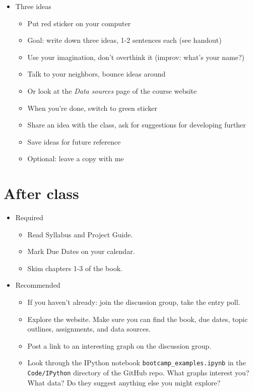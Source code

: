 \begin{itemize}
\item Three ideas
\begin{itemize}
\item Put red sticker on your computer
\item Goal:  write down three ideas, 1-2 sentences each (see handout)
\item Use your imagination, don't overthink it (improv: what's your name?)
\item Talk to your neighbors, bounce ideas around
\item Or look at the {\it Data sources\/} page of the course website
\item When you're done, switch to green sticker
\item Share an idea with the class, ask for suggestions for developing further
\item Save ideas for future reference
\item Optional:  leave a copy with me
\end{itemize}
\end{itemize}


\section*{After class}

\begin{itemize}
\item Required
\begin{itemize}
\item Read Syllabus and Project Guide.
\item Mark Due Dates on your calendar.
\item Skim chapters 1-3 of the book.
\end{itemize}
\item Recommended
\begin{itemize}
\item If you haven't already:  join the discussion group, take the entry poll.
\item Explore the website.  Make sure you can find the book, due dates,
topic outlines, assignments, and data sources.
\item Post a link to an interesting graph on the discussion group.
\item Look through the IPython notebook \verb|bootcamp_examples.ipynb|
in the {\tt Code/IPython} directory of the GitHub repo.
What graphs interest you?  What data?
Do they suggest anything else you might explore?
\end{itemize}
\end{itemize}




